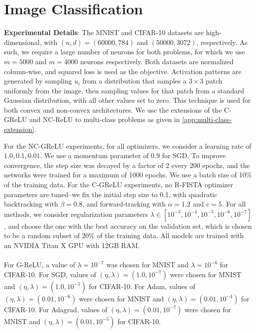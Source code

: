 
\section{Image Classification}\label{app:image-datasets}

\textbf{Experimental Details}:
The MNIST and CIFAR-10 datasets are high-dimensional, with \((n, d) = (60000, 784)\) and \((50000,3072)\), respectively.
As such, we require a large number of neurons for both problems, for which we use \(m=5000\) and \(m=4000\) neurons respectively.
Both datasets are normalized column-wise, and squared loss is used as the objective.
Activation patterns are generated by sampling \( u_i \) from a distribution that samples a \(3 \times 3\) patch uniformly from the image, then sampling values for that patch from a standard Gaussian distribution, with all other values set to zero.
This technique is used for both convex and non-convex architectures.
We use the extensions of the C-GReLU and NC-ReLU to multi-class problems as given in \cref{app:multi-class-extension}.

For the NC-GReLU experiments, for all optimizers, we consider a learning rate of \(1.0, 0.1, 0.01\).
We use a momentum parameter of 0.9 for SGD.
To improve convergence, the step size was decayed by a factor of 2 every 200 epochs, and the networks were trained for a maximum of 1000 epochs.
We use a batch size of 10\% of the training data.
For the C-GReLU experiments, no R-FISTA optimizer parameters are tuned--we fix the initial step size to 0.1, with quadratic backtracking with \(\beta = 0.8\), and forward-tracking with \(\alpha = 1.2\) and \(c=5\).
For all methods, we consider regularization parameters \(\lambda \in [10^{-3}, 10^{-4}, 10^{-5}, 10^{-6}, 10^{-7}]\), and choose the one with the best accuracy on the validation set, which is chosen to be a random subset of 20\% of the training data.
All models are trained with an NVIDIA Titan X GPU with 12GB RAM.
\\\\
For G-ReLU, a value of \(\lambda=10^{-7}\) was chosen for MNIST and \(\lambda=10^{-6}\) for CIFAR-10.
For SGD, values of \((\eta, \lambda) = (1.0, 10^{-7})\) were chosen for MNIST and \((\eta, \lambda) = (1.0, 10^{-5})\) for CIFAR-10.
For Adam, values of \((\eta, \lambda) = (0.01, 10^{-6})\) were chosen for MNIST and \((\eta, \lambda) = (0.01, 10^{-4})\) for CIFAR-10.
For Adagrad, values of \((\eta, \lambda) = (0.01, 10^{-7})\) were chosen for MNIST and \((\eta, \lambda) = (0.01, 10^{-5})\)  for CIFAR-10.
